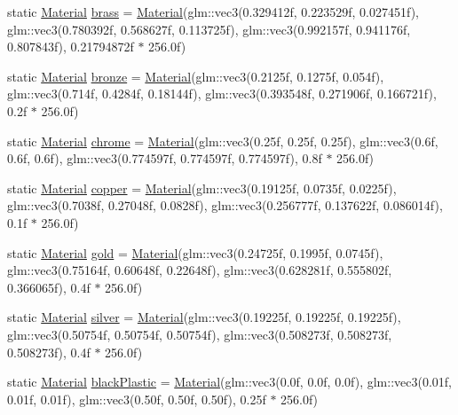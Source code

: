 \begin{DoxyCompactItemize}
\item 
static \mbox{\hyperlink{struct_material}{Material}} \mbox{\hyperlink{struct_material_a9db90c13365c8487d52c24bb2ab1882b}{brass}} = \mbox{\hyperlink{struct_material}{Material}}(glm\+::vec3(0.\+329412f, 0.\+223529f, 0.\+027451f), glm\+::vec3(0.\+780392f, 0.\+568627f, 0.\+113725f), glm\+::vec3(0.\+992157f, 0.\+941176f, 0.\+807843f), 0.\+21794872f $\ast$ 256.\+0f)
\item 
static \mbox{\hyperlink{struct_material}{Material}} \mbox{\hyperlink{struct_material_ac43b7a8224541fce0de9de18ff4add8c}{bronze}} = \mbox{\hyperlink{struct_material}{Material}}(glm\+::vec3(0.\+2125f, 0.\+1275f, 0.\+054f), glm\+::vec3(0.\+714f, 0.\+4284f, 0.\+18144f), glm\+::vec3(0.\+393548f, 0.\+271906f, 0.\+166721f), 0.\+2f $\ast$ 256.\+0f)
\item 
static \mbox{\hyperlink{struct_material}{Material}} \mbox{\hyperlink{struct_material_a49a439730bf4934813e885d6458e496d}{chrome}} = \mbox{\hyperlink{struct_material}{Material}}(glm\+::vec3(0.\+25f, 0.\+25f, 0.\+25f), glm\+::vec3(0.\+6f, 0.\+6f, 0.\+6f), glm\+::vec3(0.\+774597f, 0.\+774597f, 0.\+774597f), 0.\+8f $\ast$ 256.\+0f)
\item 
static \mbox{\hyperlink{struct_material}{Material}} \mbox{\hyperlink{struct_material_aad09f525699803a4ed3e7cd6afd3f8a5}{copper}} = \mbox{\hyperlink{struct_material}{Material}}(glm\+::vec3(0.\+19125f, 0.\+0735f, 0.\+0225f), glm\+::vec3(0.\+7038f, 0.\+27048f, 0.\+0828f), glm\+::vec3(0.\+256777f, 0.\+137622f, 0.\+086014f), 0.\+1f $\ast$ 256.\+0f)
\item 
static \mbox{\hyperlink{struct_material}{Material}} \mbox{\hyperlink{struct_material_ae23eaaf9a27a2b9d9a218d1ea3f803e0}{gold}} = \mbox{\hyperlink{struct_material}{Material}}(glm\+::vec3(0.\+24725f, 0.\+1995f, 0.\+0745f), glm\+::vec3(0.\+75164f, 0.\+60648f, 0.\+22648f), glm\+::vec3(0.\+628281f, 0.\+555802f, 0.\+366065f), 0.\+4f $\ast$ 256.\+0f)
\item 
static \mbox{\hyperlink{struct_material}{Material}} \mbox{\hyperlink{struct_material_aef9dfcd5c4f7aaa53ee68831a19f68ca}{silver}} = \mbox{\hyperlink{struct_material}{Material}}(glm\+::vec3(0.\+19225f, 0.\+19225f, 0.\+19225f), glm\+::vec3(0.\+50754f, 0.\+50754f, 0.\+50754f), glm\+::vec3(0.\+508273f, 0.\+508273f, 0.\+508273f), 0.\+4f $\ast$ 256.\+0f)
\item 
static \mbox{\hyperlink{struct_material}{Material}} \mbox{\hyperlink{struct_material_a7d31f06894812f15ccca287f46703b99}{black\+Plastic}} = \mbox{\hyperlink{struct_material}{Material}}(glm\+::vec3(0.\+0f, 0.\+0f, 0.\+0f), glm\+::vec3(0.\+01f, 0.\+01f, 0.\+01f), glm\+::vec3(0.\+50f, 0.\+50f, 0.\+50f), 0.\+25f $\ast$ 256.\+0f)

\end{DoxyCompactItemize}
